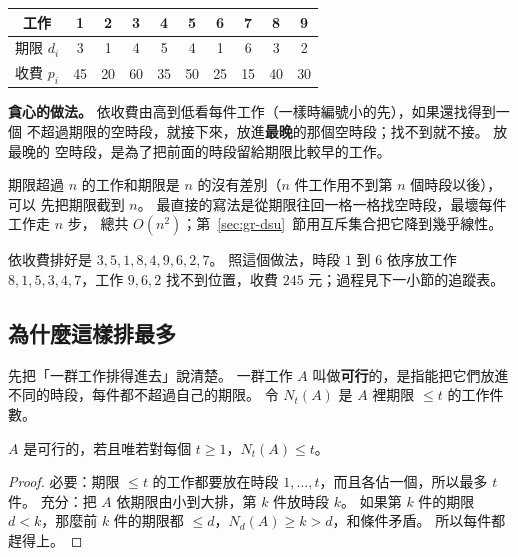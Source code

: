 \begin{center}
\begin{tabular}{c*{9}{c}}
\toprule
工作 & 1 & 2 & 3 & 4 & 5 & 6 & 7 & 8 & 9 \\
\midrule
期限 $d_i$ & 3 & 1 & 4 & 5 & 4 & 1 & 6 & 3 & 2 \\
收費 $p_i$ & 45 & 20 & 60 & 35 & 50 & 25 & 15 & 40 & 30 \\
\bottomrule
\end{tabular}
\end{center}

\textbf{貪心的做法。} 依收費由高到低看每件工作（一樣時編號小的先），如果還找得到一個
不超過期限的空時段，就接下來，放進\textbf{最晚}的那個空時段；找不到就不接。 放最晚的
空時段，是為了把前面的時段留給期限比較早的工作。

期限超過 $n$ 的工作和期限是 $n$ 的沒有差別（$n$ 件工作用不到第 $n$ 個時段以後），可以
先把期限截到 $n$。 最直接的寫法是從期限往回一格一格找空時段，最壞每件工作走 $n$ 步，
總共 $O(n^2)$；第~\ref{sec:gr-dsu}~節用互斥集合把它降到幾乎線性。

依收費排好是 $3, 5, 1, 8, 4, 9, 6, 2, 7$。 照這個做法，時段 $1$ 到 $6$ 依序放工作
$8, 1, 5, 3, 4, 7$，工作 $9, 6, 2$ 找不到位置，收費 $245$ 元；過程見下一小節的追蹤表。

\subsection{為什麼這樣排最多}

先把「一群工作排得進去」說清楚。 一群工作 $A$ 叫做\textbf{可行}的，是指能把它們放進
不同的時段，每件都不超過自己的期限。 令 $N_t(A)$ 是 $A$ 裡期限 $\le t$ 的工作件數。

\begin{lemma}
\label{lem:gr-feasible}
$A$ 是可行的，若且唯若對每個 $t \ge 1$，$N_t(A) \le t$。
\end{lemma}

\begin{proof}
必要：期限 $\le t$ 的工作都要放在時段 $1, \ldots, t$，而且各佔一個，所以最多 $t$
件。 充分：把 $A$ 依期限由小到大排，第 $k$ 件放時段 $k$。 如果第 $k$ 件的期限
$d < k$，那麼前 $k$ 件的期限都 $\le d$，$N_d(A) \ge k > d$，和條件矛盾。 所以每件都
趕得上。
\end{proof}

